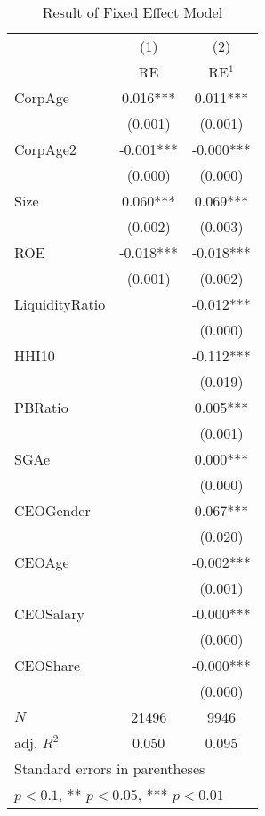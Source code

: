 \begin{table}[htbp]\centering
\def\sym#1{\ifmmode^{#1}\else\(^{#1}\)\fi}
\caption{Result of Fixed Effect Model \label{tab:regressionFE}}
\begin{tabular}{l*{2}{c}}
\hline\hline
            &\multicolumn{1}{c}{(1)}&\multicolumn{1}{c}{(2)}\\
            &\multicolumn{1}{c}{RE}&\multicolumn{1}{c}{RE$^{1}$}\\
\hline
CorpAge     &       0.016***&       0.011***\\
            &     (0.001)   &     (0.001)   \\
[1em]
CorpAge2    &      -0.001***&      -0.000***\\
            &     (0.000)   &     (0.000)   \\
[1em]
Size        &       0.060***&       0.069***\\
            &     (0.002)   &     (0.003)   \\
[1em]
ROE         &      -0.018***&      -0.018***\\
            &     (0.001)   &     (0.002)   \\
[1em]
LiquidityRatio&               &      -0.012***\\
            &               &     (0.000)   \\
[1em]
HHI10       &               &      -0.112***\\
            &               &     (0.019)   \\
[1em]
PBRatio     &               &       0.005***\\
            &               &     (0.001)   \\
[1em]
SGAe        &               &       0.000***\\
            &               &     (0.000)   \\
[1em]
CEOGender   &               &       0.067***\\
            &               &     (0.020)   \\
[1em]
CEOAge      &               &      -0.002***\\
            &               &     (0.001)   \\
[1em]
CEOSalary   &               &      -0.000***\\
            &               &     (0.000)   \\
[1em]
CEOShare    &               &      -0.000***\\
            &               &     (0.000)   \\
\hline
\(N\)       &       21496   &        9946   \\
adj. \(R^{2}\)&       0.050   &       0.095   \\
\hline\hline
\multicolumn{3}{l}{\footnotesize Standard errors in parentheses}\\
\multicolumn{3}{l}{\footnotesize * \(p<0.1\), ** \(p<0.05\), *** \(p<0.01\)}\\
\end{tabular}
\end{table}
